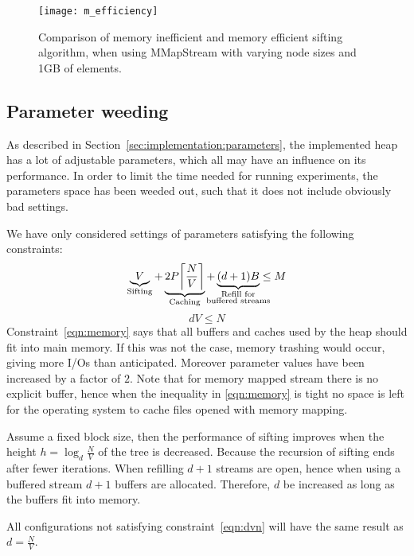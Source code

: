 \begin{figure}
  \centering
  \texttt{[image: m\_efficiency]}
  \caption{Comparison of memory inefficient and memory efficient sifting algorithm, when using MMapStream with varying node sizes and 1GB of elements.}
  \label{fig:m-efficiency}
\end{figure}

\subsection{Parameter weeding}
As described in Section~\ref{sec:implementation:parameters}, the implemented heap has a lot of adjustable parameters, which all may have an influence on its performance. In order to limit the time needed for running experiments, the parameters space has been weeded out, such that it does not include obviously bad settings.

We have only considered settings of parameters satisfying the following constraints:
\begin{equation}
  \label{eqn:memory}
  \underbrace{V}_{\textrm{Sifting}} + \underbrace{2P \ceil*{\frac{N}{V}}}_{\textrm{Caching}} + \underbrace{(d + 1)B}_{\mathclap{\substack{
  \textrm{Refill for}\\\textrm{buffered streams}
  }}} \leq M
\end{equation}
\begin{equation}
  \label{eqn:dvn}
  dV\leq N
\end{equation}
Constraint~\ref{eqn:memory} says that all buffers and caches used by the heap should fit into main memory. If this was not the case, memory trashing would occur, giving more I/Os than anticipated. Moreover parameter values have been increased by a factor of $2$. Note that for memory mapped stream there is no explicit buffer, hence when the inequality in \ref{eqn:memory} is tight no space is left for the operating system to cache files opened with memory mapping.

Assume a fixed block size, then the performance of sifting improves when the height $h = \log_d{\frac{N}{V}}$ of the tree is decreased. Because the recursion of sifting ends after fewer iterations. When refilling $d+1$ streams are open, hence when using a buffered stream $d+1$ buffers are allocated. Therefore, $d$ be increased as long as the buffers fit into memory.

All configurations not satisfying constraint~\ref{eqn:dvn} will have the same result as $d=\frac{N}{V}$.

